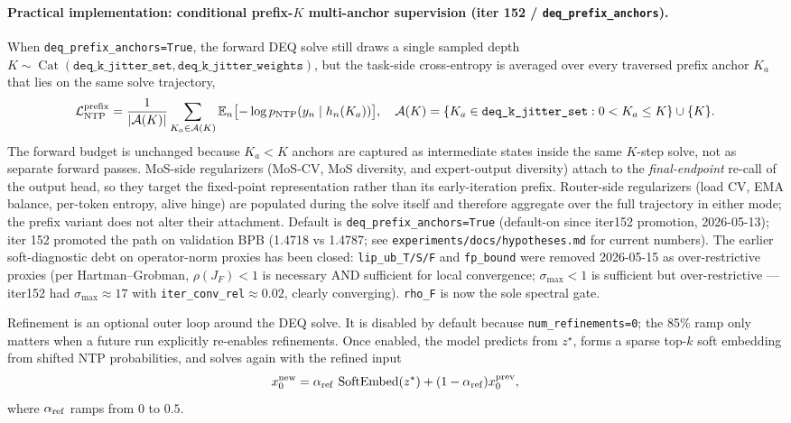 \documentclass[11pt]{article}
\begin{document}
\paragraph{Practical implementation: conditional prefix-$K$ multi-anchor
supervision (iter 152 / \texttt{deq\_prefix\_anchors}).}
When \texttt{deq\_prefix\_anchors=True}, the forward DEQ solve still draws a
single sampled depth $K\sim\operatorname{Cat}(\texttt{deq\_k\_jitter\_set},
\texttt{deq\_k\_jitter\_weights})$, but the task-side cross-entropy is
averaged over every traversed prefix anchor $K_a$ that lies on the same
solve trajectory,
\[
  \mathcal{L}_{\rm NTP}^{\rm prefix}
    = \frac{1}{|\mathcal{A}(K)|}
      \sum_{K_a\in\mathcal{A}(K)}
        \mathbb{E}_n\bigl[-\log p_{\rm NTP}(y_n\mid h_n(K_a))\bigr],
  \quad
  \mathcal{A}(K)=\{K_a\in\texttt{deq\_k\_jitter\_set}: 0<K_a\le K\}\cup\{K\}.
\]
The forward budget is unchanged because $K_a<K$ anchors are captured as
intermediate states inside the same $K$-step solve, not as separate forward
passes.  MoS-side regularizers (MoS-CV, MoS diversity, and expert-output
diversity) attach to the \emph{final-endpoint} re-call of the output head, so
they target the fixed-point representation rather than its early-iteration
prefix.  Router-side regularizers (load CV, EMA balance, per-token entropy,
alive hinge) are populated during the solve itself and therefore aggregate
over the full trajectory in either mode; the prefix variant does not alter
their attachment.  Default is \texttt{deq\_prefix\_anchors=True} (default-on
since iter152 promotion, 2026-05-13); iter 152 promoted the path on validation
BPB (1.4718 vs 1.4787; see \texttt{experiments/docs/hypotheses.md} for current
numbers).  The earlier soft-diagnostic debt on operator-norm proxies has been
closed: \texttt{lip\_ub\_T/S/F} and \texttt{fp\_bound} were removed 2026-05-15
as over-restrictive proxies (per Hartman--Grobman, $\rho(J_F)<1$ is necessary
AND sufficient for local convergence; $\sigma_{\max}<1$ is sufficient but
over-restrictive — iter152 had $\sigma_{\max}\approx 17$ with
\texttt{iter\_conv\_rel}$\approx 0.02$, clearly converging).  \texttt{rho\_F}
is now the sole spectral gate.

Refinement is an optional outer loop around the DEQ solve.  It is disabled by
default because \texttt{num\_refinements=0}; the 85\% ramp only matters when a
future run explicitly re-enables refinements.  Once enabled, the model predicts
from $z^\star$, forms a sparse top-$k$ soft embedding from shifted NTP
probabilities, and solves again with the refined input
\[
  x_0^{\rm new}
    = \alpha_{\rm ref}\, \operatorname{SoftEmbed}(z^\star)
      +(1-\alpha_{\rm ref})x_0^{\rm prev},
\]
where $\alpha_{\rm ref}$ ramps from $0$ to $0.5$.
\end{document}
